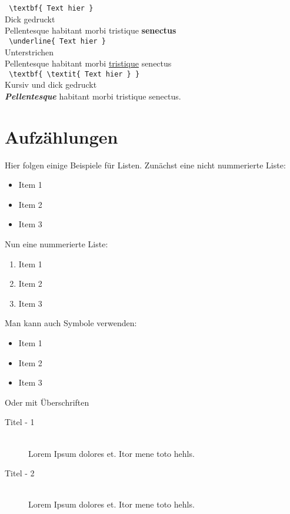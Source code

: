     \texttt{ \textbackslash textbf\{ Text hier \} } \\
    Dick gedruckt \\
    Pellentesque habitant morbi tristique \textbf{senectus} \\

    \texttt{ \textbackslash underline\{ Text hier \} } \\
    Unterstrichen \\
    Pellentesque habitant morbi \underline{tristique} senectus \\

    \texttt{ \textbackslash textbf\{ \textbackslash textit\{ Text hier \} \} } \\
    Kursiv und dick gedruckt \\
    \textbf{\textit{Pellentesque}} habitant morbi tristique senectus. \\

\section{Aufzählungen} \label{sec:items}
    Hier folgen einige Beispiele für Listen. Zunächst eine nicht nummerierte Liste: 
    \begin{itemize}
        \item Item 1
        \item Item 2
        \item Item 3
    \end{itemize}

    Nun eine nummerierte Liste:
    \begin{enumerate}
        \item Item 1
        \item Item 2
        \item Item 3
    \end{enumerate}

    Man kann auch Symbole verwenden:
    \begin{itemize}
    \renewcommand{\labelitemi}{$\rightarrow$}
        \item Item 1
        \item Item 2
        \item Item 3
    \end{itemize}

    Oder mit Überschriften
    \begin{description}
        \item[Titel - 1] \hfill \\ 
            Lorem Ipsum dolores et. Itor mene toto hehls.
        \item[Titel - 2] \hfill \\ 
            Lorem Ipsum dolores et. Itor mene toto hehls.
    \end{description}